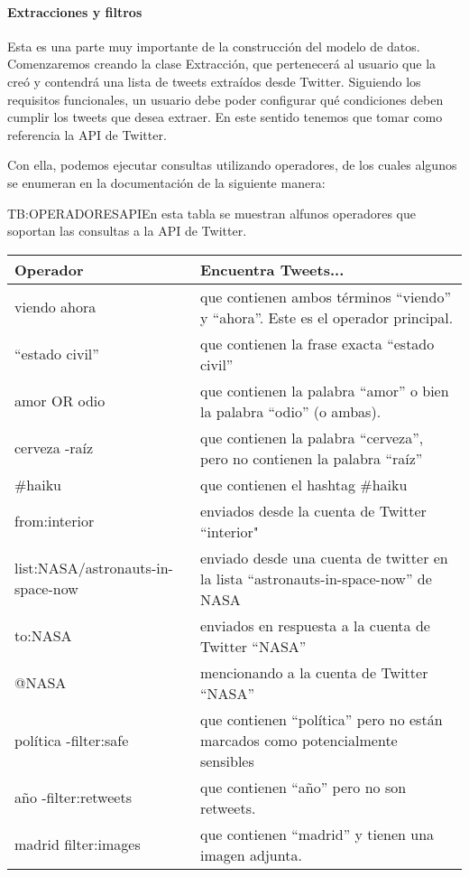 \paragraph{Extracciones y filtros}
Esta es una parte muy importante de la construcción del modelo de datos. Comenzaremos creando la clase Extracción, que pertenecerá al usuario que la creó y contendrá una lista de tweets extraídos desde Twitter.
Siguiendo los requisitos funcionales, un usuario debe poder configurar qué condiciones deben cumplir los tweets que desea extraer. En este sentido tenemos que tomar como referencia la API de Twitter. 

Con ella, podemos ejecutar consultas utilizando operadores, de los cuales algunos se enumeran en la documentación de la siguiente manera:
\begin{table}[Operadores de Twitter API]{TB:OPERADORESAPI}{En esta tabla se muestran alfunos operadores que soportan las consultas a la API de Twitter.}
\begin{tabular}{|p{3.5cm}|p{11.5cm}|}
\hline
\textbf{Operador} & \textbf{Encuentra Tweets...} \\
\hline \hline
viendo ahora & que contienen ambos términos ``viendo'' y ``ahora''. Este es el operador principal.\\
``estado civil'' & que contienen la frase exacta ``estado civil''\\
amor OR odio & que contienen la palabra ``amor'' o bien la palabra ``odio'' (o ambas).\\
cerveza -raíz & que contienen la palabra ``cerveza'', pero no contienen la palabra ``raíz''\\
\#haiku & que contienen el hashtag \#haiku \\
from:interior & enviados desde la cuenta de Twitter ``interior"\\
list:NASA/astronauts-in-space-now & enviado desde una cuenta de twitter en la lista ``astronauts-in-space-now'' de NASA\\
to:NASA & enviados en respuesta a la cuenta de Twitter ``NASA''\\
@NASA & mencionando a la cuenta de Twitter ``NASA''\\
política -filter:safe & que contienen ``política'' pero no están marcados como potencialmente sensibles \\
año -filter:retweets & que contienen ``año'' pero no son retweets.\\
madrid filter:images & que contienen ``madrid'' y tienen una imagen adjunta.\\

\end{tabular}
\end{table}
